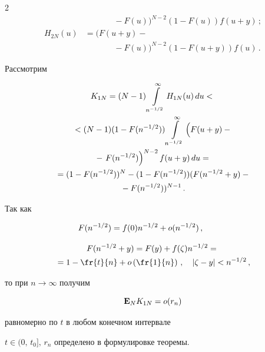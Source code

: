\begin{multicols}{2}
\begin{align*}
&\ \ \ \ \ \ \ \ \ \ \ \ \ \ \ \ {}- F(u))^{N-2}(1-F(u))f(u+y)\,;\\


H_{2N}(u)&=(F(u+y)-{}\\


&\ \ \ \ \ \ \ \ \ \ \ \ \ \ \ \ {}-F(u))^{N-2}(1-F(u+y))f(u)\,. 


\end{align*} 


Рассмотрим


\begin{multline*}


K_{1N}=(N-1)\int\limits_{n^{-1/2}}^{\infty}H_{1N}(u)\,du<{}\\


{}<(N-1)


(1-F(n^{-1/2}))\int\limits_{n^{-1/2}}^{\infty}


\left (\vphantom{\left. F(n^{-1/2})\right )}F(u+y)-{}\right.\\


{}-\left. F(n^{-1/2})\right )^{N-2}f(u+y)\,du={}\\


{}=(1-F(n^{-1/2}))^{N}-(1-F(n^{-1/2}))(F(n^{-1/2}+y)-{}\\


{}-F(n^{-1/2}))^{N-1}\,.


\end{multline*}


Так как 


$$


F(n^{-1/2})=f(0)n^{-1/2}+o(n^{-1/2})\,,\hspace*{30pt}


$$


\begin{multline*}


F(n^{-1/2}+y)=F(y)+f(\zeta)n^{-1/2}={}\\


{}=1-\fr{t}{n}+o\left(\fr{1}{n}\right)\,,


\quad |\zeta-y|<n^{-1/2}\,, 


\end{multline*} 


то при $n \to \infty$ получим 


$$


{\bf E}_NK_{1N}=o(r_n)


$$ 


равномерно по $t$ в любом конечном интервале


$t\in(0,\,t_0], \, r_n$ определено в формулировке теоремы.



\end{multicols}
